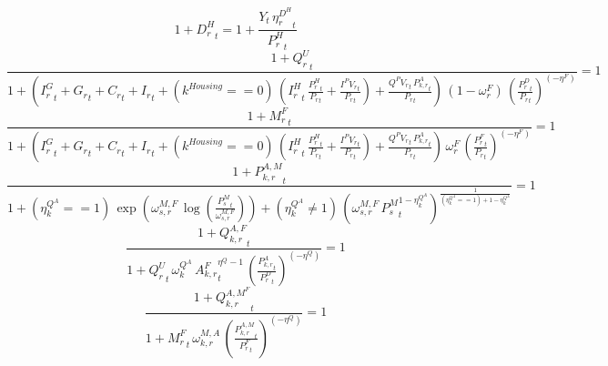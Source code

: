 \noindent[name= `housing damage 1']
\begin{dmath}
1+{{D^H_r}}_{t}=1+\frac{{Y}_{t}\, {{\eta^{D^{H}}_r}}_{t}}{{{P^H_r}}_{t}}
\end{dmath}
\noindent[name= `final demand for domestic production 1']
\begin{dmath}
\frac{1+{{Q^{U}_{r}}}_{t}}{1+\left({{I^G_{r}}}_{t}+{{G_{r}}}_{t}+{{C_r}}_{t}+{{I_{r}}}_{t}+\left({{k^{Housing}}}==0\right)\, \left({{I^H_r}}_{t}\, \frac{{{P^H_r}}_{t}}{{{P_{r}}}_{t}}+\frac{{{I^PV_r}}_{t}}{{{P_{r}}}_{t}}\right)+\frac{{{Q^PV_r}}_{t}\, {{P^{A}_{k,r}}}_{t}}{{{P_{r}}}_{t}}\right)\, \left(1-{{\omega^{F}_{r}}}\right)\, \left(\frac{{{P^D_{r}}}_{t}}{{{P_{r}}}_{t}}\right)^{\left(-{{\eta^{F}}}\right)}}=1
\end{dmath}
\noindent[name= `final demand for imports 1']
\begin{dmath}
\frac{1+{{M^F_r}}_{t}}{1+\left({{I^G_{r}}}_{t}+{{G_{r}}}_{t}+{{C_r}}_{t}+{{I_{r}}}_{t}+\left({{k^{Housing}}}==0\right)\, \left({{I^H_r}}_{t}\, \frac{{{P^H_r}}_{t}}{{{P_{r}}}_{t}}+\frac{{{I^PV_r}}_{t}}{{{P_{r}}}_{t}}\right)+\frac{{{Q^PV_r}}_{t}\, {{P^{A}_{k,r}}}_{t}}{{{P_{r}}}_{t}}\right)\, {{\omega^{F}_{r}}}\, \left(\frac{{{P^F_{r}}}_{t}}{{{P_{r}}}_{t}}\right)^{\left(-{{\eta^{F}}}\right)}}=1
\end{dmath}
\noindent[name= `sector import price index 1 1']
\begin{dmath}
\frac{1+{{P^{A,M}_{k,r}}}_{t}}{1+\left({{\eta^{Q^A}_{k}}}==1\right)\, \exp\left({{\omega^{M,F}_{s,r}}}\, \log\left(\frac{{{P^{M}_s}}_{t}}{{{\omega^{M,F}_{s,r}}}}\right)\right)+\left({{\eta^{Q^A}_{k}}}\neq 1\right)\, \left({{\omega^{M,F}_{s,r}}}\, {{P^{M}_s}}_{t}^{1-{{\eta^{Q^A}_{k}}}}\right)^{\frac{1}{\left({{\eta^{Q^A}_{k}}}==1\right)+1-{{\eta^{Q^A}_{k}}}}}}=1
\end{dmath}
\noindent[name= `final demand for sector output 1 1']
\begin{dmath}
\frac{1+{{Q^{A,F}_{k,r}}}_{t}}{1+{{Q^{U}_{r}}}_{t}\, {{\omega^{Q^A}_{k}}}\, {{A^{F}_{k,r}}}_{t}^{{{\eta^{Q}}}-1}\, \left(\frac{{{P^{A}_{k,r}}}_{t}}{{{P^D_{r}}}_{t}}\right)^{\left(-{{\eta^{Q}}}\right)}}=1
\end{dmath}
\noindent[name= `final demand for sector imports 1 1']
\begin{dmath}
\frac{1+{{Q^{A,M^F}_{k,r}}}_{t}}{1+{{M^F_r}}_{t}\, {{\omega^{M,A}_{k,r}}}\, \left(\frac{{{P^{A,M}_{k,r}}}_{t}}{{{P^F_{r}}}_{t}}\right)^{\left(-{{\eta^{Q}}}\right)}}=1
\end{dmath}
